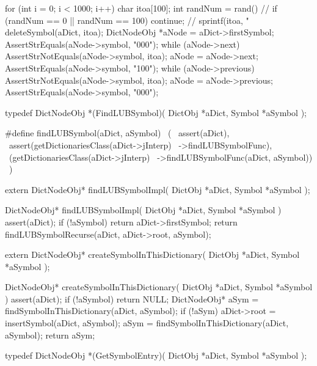   for (int i = 0; i < 1000; i++) {
    char itoa[100];
    int randNum = rand() %
    //
    if (randNum == 0 || randNum == 100) continue;
    //
    sprintf(itoa, "%
    deleteSymbol(aDict, itoa);
    DictNodeObj *aNode = aDict->firstSymbol;
    AssertStrEquals(aNode->symbol, "000");
    while (aNode->next) {
      AssertStrNotEquals(aNode->symbol, itoa);
      aNode = aNode->next;
    }
    AssertStrEquals(aNode->symbol, "100");   
    while (aNode->previous) {
      AssertStrNotEquals(aNode->symbol, itoa);
      aNode = aNode->previous;
    }
    AssertStrEquals(aNode->symbol, "000");
  }  
\stopCTest
\stopTestCase
\stopTestSuite

\startTestSuite[findLUBSymbol]
\startCHeader
typedef DictNodeObj *(FindLUBSymbol)(
  DictObj *aDict,
  Symbol  *aSymbol
);

#define findLUBSymbol(aDict, aSymbol)           \
  (                                             \
    assert(aDict),                              \
    assert(getDictionariesClass(aDict->jInterp) \
      ->findLUBSymbolFunc),                     \
    (getDictionariesClass(aDict->jInterp)       \
      ->findLUBSymbolFunc(aDict, aSymbol))      \
  )
\stopCHeader

\setCHeaderStream{private}
\startCHeader
extern DictNodeObj* findLUBSymbolImpl(
  DictObj *aDict,
  Symbol  *aSymbol
);
\stopCHeader
\setCHeaderStream{public}

\startCCode
DictNodeObj* findLUBSymbolImpl(
  DictObj *aDict,
  Symbol  *aSymbol
) {
  assert(aDict);
  if (!aSymbol) return aDict->firstSymbol;
  return findLUBSymbolRecurse(aDict, aDict->root, aSymbol);
}
\stopCCode
\stopTestSuite

\startTestSuite[createSymbolInThisDictionary]

\setCHeaderStream{private}
\startCHeader
extern DictNodeObj* createSymbolInThisDictionary(
  DictObj *aDict,
  Symbol  *aSymbol
);
\stopCHeader
\setCHeaderStream{public}

\startCCode
DictNodeObj* createSymbolInThisDictionary(
  DictObj *aDict,
  Symbol  *aSymbol
) {
  assert(aDict);
  if (!aSymbol) return NULL;
  DictNodeObj* aSym =
    findSymbolInThisDictionary(aDict, aSymbol);
  if (!aSym) {
    aDict->root = insertSymbol(aDict, aSymbol);
    aSym = findSymbolInThisDictionary(aDict, aSymbol);
  }
  return aSym;
}
\stopCCode
\stopTestSuite

\startTestSuite[getSymbolEntry]

\startCHeader
typedef DictNodeObj *(GetSymbolEntry)(
  DictObj *aDict,
  Symbol  *aSymbol
);

